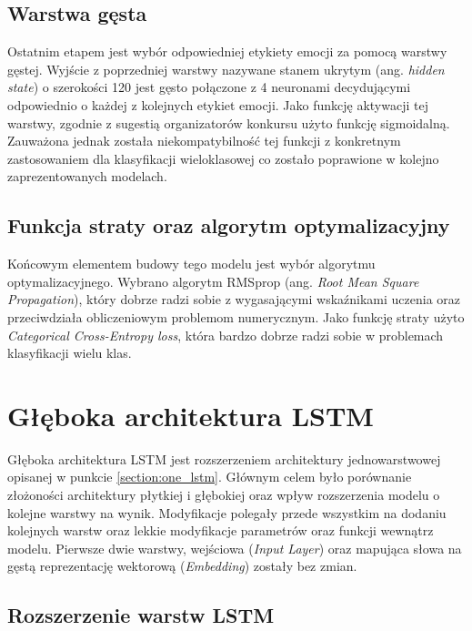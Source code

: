 \subsection{Warstwa gęsta}

Ostatnim etapem jest wybór odpowiedniej etykiety emocji za pomocą warstwy gęstej. Wyjście z poprzedniej warstwy nazywane stanem ukrytym (ang. \textit{hidden state}) o szerokości 120 jest gęsto połączone z 4 neuronami decydującymi odpowiednio o każdej z kolejnych etykiet emocji. Jako funkcję aktywacji tej warstwy, zgodnie z sugestią organizatorów konkursu użyto funkcję sigmoidalną. Zauważona jednak została niekompatybilność tej funkcji z konkretnym zastosowaniem dla klasyfikacji wieloklasowej co zostało poprawione w kolejno zaprezentowanych modelach.  

\subsection{Funkcja straty oraz algorytm optymalizacyjny}

Końcowym elementem budowy tego modelu jest wybór algorytmu optymalizacyjnego. Wybrano algorytm RMSprop \cite{ruder2016overview} (ang. \textit{Root Mean Square Propagation}), który dobrze radzi sobie z wygasającymi wskaźnikami uczenia oraz przeciwdziała obliczeniowym problemom numerycznym. Jako funkcję straty użyto \textit{Categorical Cross-Entropy loss}, która bardzo dobrze radzi sobie w problemach klasyfikacji wielu klas.

\section{Głęboka architektura LSTM}
\label{section:deep_lstm}

Głęboka architektura LSTM jest rozszerzeniem architektury jednowarstwowej opisanej w punkcie \ref{section:one_lstm}. Głównym celem było porównanie złożoności architektury płytkiej i głębokiej oraz wpływ rozszerzenia modelu o kolejne warstwy na wynik. Modyfikacje polegały przede wszystkim na dodaniu kolejnych warstw oraz lekkie modyfikacje parametrów oraz funkcji wewnątrz modelu. Pierwsze dwie warstwy, wejściowa (\textit{Input Layer}) oraz mapująca słowa na gęstą reprezentację wektorową (\textit{Embedding}) zostały bez zmian.

\subsection{Rozszerzenie warstw LSTM}


